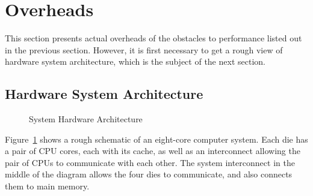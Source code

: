 
\section{Overheads}
\label{sec:cpu:Overheads}

This section presents actual overheads of the obstacles to performance
listed out in the previous section.
However, it is first necessary to get a rough view of hardware system
architecture, which is the subject of the next section.

\subsection{Hardware System Architecture}
\label{sec:cpu:Hardware System Architecture}

\begin{figure}[tb]
\begin{center}
\end{center}
\caption{System Hardware Architecture}
\label{fig:cpu:System Hardware Architecture}
\end{figure}

Figure~\ref{fig:cpu:System Hardware Architecture}
shows a rough schematic of an eight-core computer system.
Each die has a pair of CPU cores, each with its cache, as well as an
interconnect allowing the pair of CPUs to communicate with each other.
The system interconnect in the middle of the diagram allows the
four dies to communicate, and also connects them to main memory.

